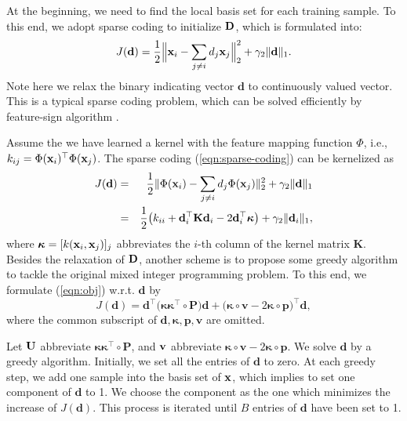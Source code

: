 At the beginning, we need to find the local basis set for each training sample. To this end, we adopt sparse coding to initialize ${\mathbf D}$, which is formulated into:
\begin{equation}
J(\mathbf d) = \frac{1}{2}\Big\| \x_i - \sum_{j\neq i}d_j\x_j \Big\|^2_2 + \gamma_2\| \mathbf d \|_1. \label{eqn:sparse-coding}
\end{equation}
Note here we relax the binary indicating vector $\mathbf d$ to continuously valued vector. This is a typical sparse coding problem, which can be solved efficiently by feature-sign algorithm \cite{nips/Lee06}.

Assume the we have learned a kernel with the feature mapping function $\Phi$, i.e., $k_{ij} = \Phi(\mathbf{x}_i)^\top\Phi(\mathbf{x}_j)$. The sparse coding (\ref{eqn:sparse-coding}) can be kernelized as
\begin{eqnarray}
J(\mathbf d) &=& \frac{1}{2}\| \Phi(\mathbf{x}_i) - \sum_{j\neq i}d_j\Phi(\mathbf{x}_j) \|_2^2+\gamma_2\| \mathbf d \|_1 \nonumber\\
&=& \frac{1}{2}\big(k_{ii} + \mathbf d_i^\top\mathbf K\mathbf d_i - 2\mathbf d_i^\top\boldsymbol{\kappa}\big) + \gamma_2\| \mathbf d_i \|_1 \nonumber,
\end{eqnarray}
where $\boldsymbol{\kappa}=[k(\mathbf{x}_i,\mathbf{x}_j)]_j$ abbreviates the $i$-th column of the kernel matrix $\mathbf K$. Besides the relaxation of ${\mathbf D}$, another scheme is to propose some greedy algorithm to tackle the original mixed integer programming problem. To this end, we formulate (\ref{eqn:obj}) w.r.t. $\mathbf d$ by
\begin{equation}
J(\mathbf d) = \mathbf d^\top\big(\bm\kappa\bm\kappa^\top\circ\mathbf P\big)\mathbf d + \big(\bm\kappa\circ\mathbf v- 2\bm\kappa\circ\mathbf p\big)^\top\mathbf d, \label{eqn:d}
\end{equation}
where the common subscript of $\mathbf d, \bm\kappa, \mathbf p, \mathbf v$ are omitted.

Let ${\bf U}$ abbreviate $\bm\kappa\bm\kappa^\top\circ\mathbf P$, and ${\bf v}$ abbreviate $\bm\kappa\circ\mathbf v- 2\bm\kappa\circ\mathbf p$. We solve $\mathbf d$ by a greedy algorithm. Initially, we set all the entries of $\mathbf d$ to zero. At each greedy step, we add one sample into the basis set of $\mathbf{x}$, which implies to set one component of $\mathbf d$ to 1. We choose the component as the one which minimizes the increase of $J(\mathbf d)$. This process is iterated until $B$ entries of $\mathbf d$ have been set to 1.

